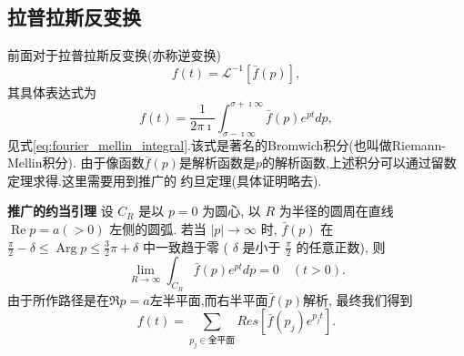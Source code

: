 \subsection{拉普拉斯反变换}
\label{subsec:inverse_laplace_transform}
前面对于拉普拉斯反变换(亦称逆变换)
\begin{equation}
    f(t) = \mathcal{L}^{-1} [ \bar{f}(p)],
\end{equation}
其具体表达式为
\begin{equation}
    f(t)=\frac{1}{2 \pi \imath} \int_{\sigma-\imath \infty}^{\sigma+\imath \infty} \bar{f}(p) e^{ p t} dp, 
\end{equation}
见式\ref{eq:fourier_mellin_integral}.该式是著名的Bromwich积分(也叫做Riemann-Mellin积分).
由于像函数$\bar{f}(p)$是解析函数是$p$的解析函数,上述积分可以通过留数定理求得.这里需要用到推广的
约旦定理(具体证明略去).

\textbf{推广的约当引理} 设 $C_R$ 是以 $p=0$ 为圆心, 以 $R$ 为半径的圆周在直线 $\operatorname{Re} p=a(>0)$ 左侧的圆弧. 若当 $|p| \rightarrow \infty$ 时, $\bar{f}(p)$ 在 $\frac{\pi}{2}-\delta \leqslant \operatorname{Arg} p \leqslant \frac{3}{2} \pi+\delta$ 中一致趋于零 ( $\delta$ 是小于 $\frac{\pi}{2}$ 的任意正数), 则
$$
\lim _{R \rightarrow \infty} \int_{C_R} \bar{f}(p) e^{p t} d p=0 \quad(t>0) .
$$
由于所作路径是在$\Re p = a$左半平面,而右半平面$\bar{f}(p)$解析, 最终我们得到
\begin{equation}
    f(t) = \sum_{p_j \in \text{全平面}} Res [ \bar{f}(p_j) e^{p_j t}].
\end{equation}

